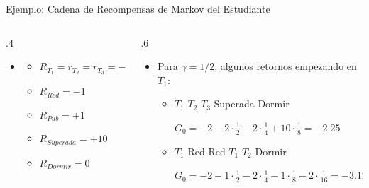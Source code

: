 \documentclass[10pt, envcountsect, handout, aspectratio=1610, hyperref={hypertexnames=true}]{beamer}
\begin{document}
\begin{frame}{Ejemplo: Cadena de Recompensas de Markov del Estudiante}
{\begin{minipage}{\textwidth}
\end{minipage}}




\begin{columns}

\begin{column}{.4\textwidth}

\begin{itemize}
    \item[] 
    \begin{itemize}
    \item $R_{T_1}=r_{T_2}=r_{T_3} = -2$
    \item $R_{Red}= -1$
    \item $R_{Pub}= +1$
    \item $R_{Superada}= +10$
    \item $R_{Dormir}=0$
    \end{itemize}
\end{itemize}


\end{column}


\begin{column}{.6\textwidth}


\begin{itemize}
\item[] Para $\gamma=1/2$, algunos retornos empezando en $T_1$:


\begin{itemize}
\item $T_1$ $T_2$ $T_3$ Superada Dormir

$G_0 =  -2 - 2 \cdot \frac{1}{2} - 2 \cdot \frac{1}{4} + 10 \cdot \frac{1}{8} = -2.25$


\item $T_1$ Red Red $T_1$ $T_2$ Dormir

$G_0 = -2 - 1 \cdot \frac{1}{2} - 2 \cdot \frac{1}{4} - 1 \cdot \frac{1}{8} - 2 \cdot \frac{1}{16} = -3.125$


%
%
%
\end{itemize}
\end{itemize}


\end{column}
\end{columns}
\end{frame}
\end{document}
